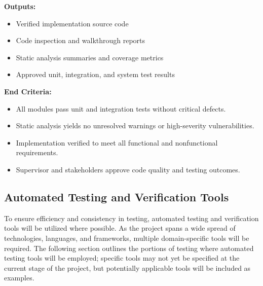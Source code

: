 \documentclass[12pt, titlepage]{article}
\begin{document}
\noindent\textbf{Outputs:}
\begin{itemize}
  \item Verified implementation source code
  \item Code inspection and walkthrough reports
  \item Static analysis summaries and coverage metrics
  \item Approved unit, integration, and system test results
\end{itemize}

\noindent\textbf{End Criteria:}
\begin{itemize}
  \item All modules pass unit and integration tests without critical defects.
  \item Static analysis yields no unresolved warnings or high-severity vulnerabilities.
  \item Implementation verified to meet all functional and nonfunctional requirements.
  \item Supervisor and stakeholders approve code quality and testing outcomes.
\end{itemize}


\subsection{Automated Testing and Verification Tools}





To ensure efficiency and consistency in testing, automated testing and verification
tools will be utilized where possible. As the project spans a wide spread of technologies,
languages, and frameworks, multiple domain-specific tools will be required. The following
section outlines the portions of testing where automated testing tools will be employed; 
specific tools may not yet be specified at the current stage of the project, but potentially
applicable tools will be included as examples. 
\end{document}

